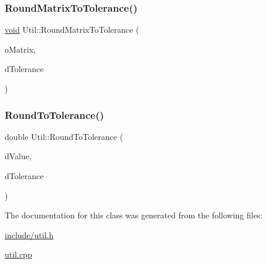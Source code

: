 \subsubsection{\texorpdfstring{Round\+Matrix\+To\+Tolerance()}{RoundMatrixToTolerance()}}
{\footnotesize\ttfamily \hyperlink{lp__lib_8h_ac7828c7b2b31d2e11af17bdb6289c5d9}{void} Util\+::\+Round\+Matrix\+To\+Tolerance (\begin{DoxyParamCaption}\item[{Double\+Matrix \&}]{o\+Matrix,  }\item[{double}]{d\+Tolerance }\end{DoxyParamCaption})\hspace{0.3cm}{\ttfamily [static]}}

\mbox{\label{class_l_i_b___l_a_1_1_util_ad36218db4e69ef6049ec5ea906ea5b2e}} 
\subsubsection{\texorpdfstring{Round\+To\+Tolerance()}{RoundToTolerance()}}
{\footnotesize\ttfamily double Util\+::\+Round\+To\+Tolerance (\begin{DoxyParamCaption}\item[{double}]{d\+Value,  }\item[{double}]{d\+Tolerance }\end{DoxyParamCaption})\hspace{0.3cm}{\ttfamily [static]}}



The documentation for this class was generated from the following files\+:\begin{DoxyCompactItemize}
\item 
\hyperlink{include_2util_8h}{include/util.\+h}\item 
\hyperlink{util_8cpp}{util.\+cpp}\end{DoxyCompactItemize}
